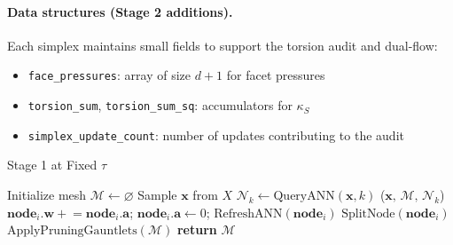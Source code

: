 \documentclass[11pt]{article}
\begin{document}
\paragraph{Data structures (Stage 2 additions).} Each simplex maintains small fields to support the torsion audit and dual-flow:
\begin{itemize}
  \item \texttt{face\_pressures}: array of size $d{+}1$ for facet pressures
  \item \texttt{torsion\_sum}, \texttt{torsion\_sum\_sq}: accumulators for $\kappa_S$
  \item \texttt{simplex\_update\_count}: number of updates contributing to the audit
\end{itemize}
\begin{algorithm}[h]
\caption{Stage 1 at Fixed $\tau$}
\label{alg:stage1}
\begin{algorithmic}[1]
    \State Initialize mesh $\mathcal M \leftarrow \varnothing$ 
    \Repeat
        \State Sample $\mathbf x$ from $X$
        \State $\mathcal{N}_k \gets \text{QueryANN}(\mathbf x, k)$ 
        \State {}($\mathbf x, \, \mathcal{M}, \, \mathcal{N}_k$)
             
                \State $\mathbf{node}_i.\mathbf w \mathrel{+}= \mathbf{node}_i.\mathbf a$; $\mathbf{node}_i.\mathbf a \gets 0$; $\text{RefreshANN}(\mathbf{node}_i)$
            \EndIf
             
                \State $\text{SplitNode}(\mathbf{node}_i)$ 
            \EndIf
        \EndFor
        \State $\text{ApplyPruningGauntlets}(\mathcal{M})$ 
    \State \textbf{return} $\mathcal M$
\EndProcedure
\end{algorithmic}
\end{algorithm}
\end{document}
